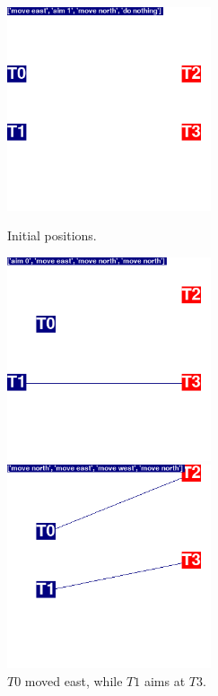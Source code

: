 \begin{figure}
\centering
\begin{minipage}{.45\textwidth}
  \centering
  \includegraphics[width=6cm]{images/animation03/screenshot01.png}
  \caption*{Initial positions.}
\end{minipage}%
\begin{minipage}{.1\textwidth}
\centering
  \caption*{ }
\end{minipage}%
\begin{minipage}{.45\textwidth}
  \centering
  \includegraphics[width=6cm]{images/animation03/screenshot02.png}
  \caption*{ $T0$ moved east, while $T1$ aims at $T3$.}
\end{minipage}
\centering
\begin{minipage}{.45\textwidth}
  \centering
  \includegraphics[width=6cm]{images/animation03/screenshot03.png}

\end{minipage}
\end{figure}
